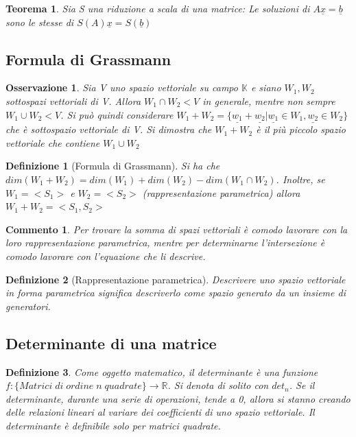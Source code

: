 \documentclass[12pt]{article}
\newenvironment{para}{\begin{adjustwidth}{13mm}{}}{\end{adjustwidth}}
\newtheorem{Definizione}{Definizione}[subsection]
\newtheorem{Teorema}{Teorema}[subsection]
\newtheorem{Commento}{Commento}[subsection]
\newtheorem{Osservazione}{Osservazione}[subsection]
\begin{document}
\begin{para}
\begin{Teorema}
Sia S una riduzione a scala di una matrice: Le soluzioni di $A\underline{x}=\underline{b}$ sono le stesse di $S(A)\underline{x}=S(\underline{b})$
\end{Teorema}
\subsection{Formula di Grassmann}
\begin{Osservazione}
     Sia V uno spazio vettoriale su campo $\mathbb{K}$ e siano $W_1, W_2$ sottospazi vettoriali di V. Allora $W_1 \cap W_2 < V$ in generale, mentre non sempre $W_1 \cup W_2 < V$. Si può quindi considerare $W_1+W_2 = \{\underline{w_1}+\underline{w_2}|\underline{w_1}\in W_1, \underline{w_2} \in W_2\}$ che è sottospazio vettoriale di V. Si dimostra che $W_1+W_2$ è il più piccolo spazio vettoriale che contiene $W_1 \cup W_2$
\end{Osservazione}

\begin{Definizione}[Formula di Grassmann]
Si ha che $dim(W_1+W_2) = dim(W_1)+dim(W_2)-dim(W_1 \cap W_2)$. Inoltre, se $W_1 = <S_1>$ e $W_2 = <S_2>$ (rappresentazione parametrica) allora $W_1+W_2 = <S_1, S_2>$
\end{Definizione}

\begin{Commento}
Per trovare la somma di spazi vettoriali è comodo lavorare con la loro rappresentazione parametrica, mentre per determinarne l'intersezione è comodo lavorare con l'equazione che li descrive.
\end{Commento}

\begin{Definizione} [Rappresentazione parametrica]
Descrivere uno spazio vettoriale in forma parametrica significa descriverlo come spazio generato da un insieme di generatori.    
\end{Definizione}

\subsection{Determinante di una matrice}
\begin{Definizione}
Come oggetto matematico, il determinante è una funzione \newline $f:\{Matrici \; di \; ordine \; n \; quadrate\} \rightarrow \mathbb{R}$. Si denota di solito con $det_n$. Se il determinante, durante una serie di operazioni, tende a 0, allora si stanno creando delle relazioni lineari al variare dei coefficienti di uno spazio vettoriale. Il determinante è definibile solo per matrici quadrate.
\end{Definizione}
\newpage

\end{para}
\end{document}
